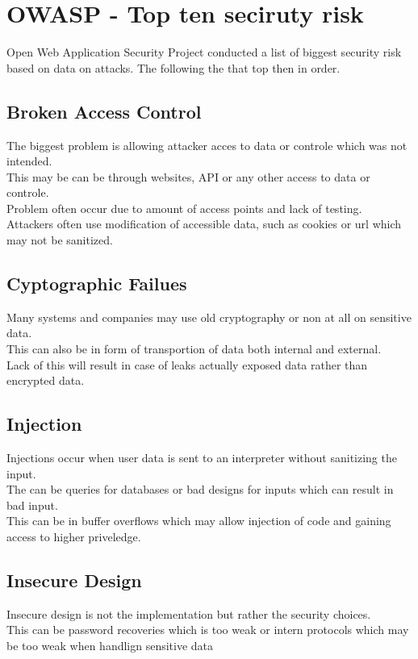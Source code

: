 \documentclass[12pt, a4paper]{article}
\begin{document}
	\section{OWASP - Top ten seciruty risk}
		Open Web Application Security Project conducted a list of biggest security risk based on data on attacks. The following the that top then in order. 
		\subsection{Broken Access Control}
			The biggest problem is allowing attacker acces to data or controle which was not intended.\\
			This may be can be through websites, API or any other access to data or controle.\\
			Problem often occur due to amount of access points and lack of testing.\\
			Attackers often use modification of accessible data, such as cookies or url which may not be sanitized.
		\subsection{Cyptographic Failues}
			Many systems and companies may use old cryptography or non at all on sensitive data.\\
			This can also be in form of transportion of data both internal and external.\\
			Lack of this will result in case of leaks actually exposed data rather than encrypted data.
		\subsection{Injection}
			Injections occur when user data is sent to an interpreter without sanitizing the input.\\
			The can be queries for databases or bad designs for inputs which can result in bad input.\\
			This can be in buffer overflows which may allow injection of code and gaining access to higher priveledge.\\
		\subsection{Insecure Design}
			Insecure design is not the implementation but rather the security choices.\\
			This can be password recoveries which is too weak or intern protocols which may be too weak when handlign sensitive data
\end{document}

